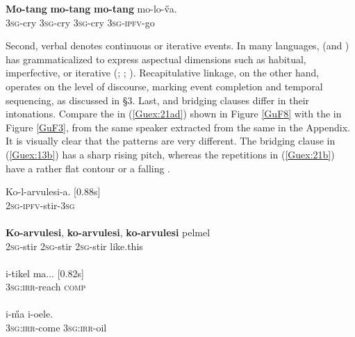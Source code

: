 \documentclass[output=paper]{LSP/langsci}
\begin{document}
\begin{exe}
\ex \label{Guex:20}
\gll    \textbf{Mo-tang}     \textbf{mo-tang}   \textbf{mo-tang} mo-lo-\H{v}a.\\     	       
 \textsc{3sg}-cry    \textsc{3sg}-cry  \textsc{3sg}-cry  \textsc{3sg-ipfv}-go\\
\glt {} \citep[][266]{guerin11}
\end{exe}


Second, verbal  denotes continuous or iterative events. In many  languages,  (and ) has grammaticalized to express aspectual dimensions such as habitual, imperfective, or iterative (\citealt[][487]{besnier00}; \citealt[][117]{guerin11}; \citealt[][260]{dimock09}). Recapitulative linkage, on the other hand, operates on the level of discourse, marking event completion and temporal sequencing, as discussed in §3. Last,  and bridging clauses differ in their intonations.  Compare  the  in (\ref{Guex:21ad}) shown in Figure \ref{GuF8} with the  in Figure \ref{GuF3}, from the same speaker extracted from the same  in the Appendix. It is  visually clear that the patterns are very different. The bridging clause in (\ref{Guex:13b}) has a sharp rising pitch, whereas the repetitions in (\ref{Guex:21b}) have a rather flat contour or a falling .

\begin{exe}
\ex \label{Guex:21ad}
\begin{xlist}
\ex \label{Guex:21a}
\gll Ko-l-arvulesi-a. [0.88s]       \\
\textsc{2sg-ipfv-}stir-\textsc{3sg}      \\
\glt {}\\
\ex \label{Guex:21b}
\gll \textbf{Ko-arvulesi},   \textbf{ko-arvulesi}, \textbf{ko-arvulesi} pelmel    \\
 \textsc{2sg-}stir \textsc{2sg-}stir \textsc{2sg-}stir  like.this \\
\glt {}\\
\ex \label{Guex:21c}
\gll   i-tikel              ma...  [0.82s] \\
   \textsc{3sg}:\textsc{irr}-reach     \textsc{comp} \\
\glt {}\\
\ex \label{Guex:21d}
\gll   i-\H{m}a        i-oele.\\     	       
 \textsc{3sg}:\textsc{irr}-come     \textsc{3sg}:\textsc{irr}-oil\\
\glt {} 
\end{xlist}
\end{exe}
\end{document}
